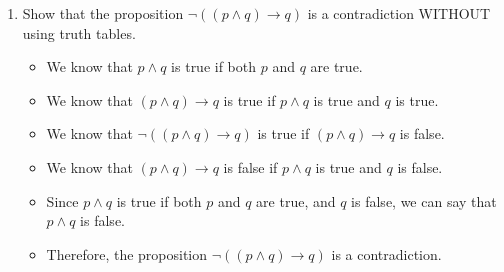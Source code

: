 \documentclass{article}
\begin{document}
\begin{enumerate}
\begin{itemize}
          \end{itemize}

    \newpage

    \item Show that the proposition $\neg ( (p \wedge q) \rightarrow q)$ is a
          contradiction WITHOUT using truth tables.

          \begin{itemize}
              \item We know that $p \wedge q$ is true if both $p$ and $q$ are true.

              \item We know that $(p \wedge q) \rightarrow q$ is true if $p \wedge q$ is true and
                    $q$ is true.

              \item We know that $\neg ( (p \wedge q) \rightarrow q)$ is true if $(p \wedge q)
                        \rightarrow q$ is false.

              \item We know that $(p \wedge q) \rightarrow q$ is false if $p \wedge q$ is true and
                    $q$ is false.

              \item Since $p \wedge q$ is true if both $p$ and $q$ are true, and $q$ is false, we
                    can say that $p \wedge q$ is false.

              \item Therefore, the proposition $\neg ( (p \wedge q) \rightarrow q)$ is a
                    contradiction.

          \end{itemize}

\end{enumerate}
\end{document}
